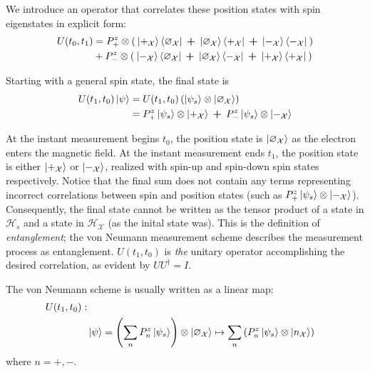 We introduce an operator that correlates these position states with spin eigenstates in explicit form:
\begin{align} \label{eq: Experiment 1 unitary operator}
  U(t_0, t_1) &= P^z_+ \otimes \left(\: \ket{+_\mathcal{X}}\bra{\varnothing_\mathcal{X}} \: \bm{+} \: \ket{\varnothing_\mathcal{X}}\bra{+_\mathcal{X}} \: \bm{+} \: \ket{-_\mathcal{X}}\bra{-_\mathcal{X}} \: \right) \\ \nonumber
  &+ P^z_- \otimes \left( \: \ket{-_\mathcal{X}}\bra{\varnothing_\mathcal{X}} \: \bm{+} \: \ket{\varnothing_\mathcal{X}}\bra{-_\mathcal{X}} \: \bm{+} \: \ket{+_\mathcal{X}}\bra{+_\mathcal{X}} \: \right)
\end{align}

Starting with a general spin state, the final state is
\begin{align} \label{eq: Experiment 1 final state}
  U(t_1, t_0)\ket{\psi} & =  U(t_1, t_0) \left(\ket{\psi_s} \otimes \ket{\varnothing_\mathcal{X}} \right) \\
  &= \nonumber P^z_+ \ket{\psi_s} \otimes \ket{+_\mathcal{X}} \: \bm{+} \: P^z_- \ket{\psi_s} \otimes \ket{-_\mathcal{X}}
\end{align}

At the instant measurement begins $t_0$, the position state is $\ket{\varnothing_\mathcal{X}}$ as the electron enters the magnetic field. At the instant measurement ends $t_1$, the position state is either $\ket{+_\mathcal{X}}$ or $\ket{-_\mathcal{X}}$, realized with spin-up and spin-down spin states respectively. Notice that the final sum does not contain any terms representing incorrect correlations between spin and position states (such as $ P^z_+ \ket{\psi_s} \otimes \ket{-_\mathcal{X}}$).  Consequently, the final state cannot be written as the tensor product of a state in $\mathcal{H}_s$ and a state in $\mathcal{H}_\mathcal{X}$ (as the inital state was). This is the definition of \textit{entanglement}; the von Neumann measurement scheme describes the measurement process as entanglement. $U(t_1, t_0)$ is \textit{the} unitary operator accomplishing the desired correlation, as evident by $UU^\dagger = I$.

The von Neumann scheme is usually written as a linear map:
\begin{align} \label{eq: general final state}
    \nonumber U(t_1, t_0): \\
    & \ket{\psi} = \left(\sum_{n} P^z_n\ket{\psi_s}\right) \otimes \ket{\varnothing_\mathcal{X}} \mapsto \sum_{n}\left(P^z_n\ket{\psi_s} \otimes \ket{n_\mathcal{X}}\right)
\end{align}
where $n = +, -$.

